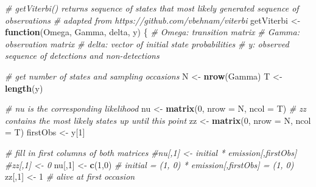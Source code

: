 \documentclass[
  12pt,
]{krantz}
\newenvironment{Shaded}{\begin{snugshade}}{\end{snugshade}}
\newcommand{\AttributeTok}[1]{\textcolor[rgb]{0.13,0.29,0.53}{#1}}
\newcommand{\CommentTok}[1]{\textcolor[rgb]{0.56,0.35,0.01}{\textit{#1}}}
\newcommand{\ControlFlowTok}[1]{\textcolor[rgb]{0.13,0.29,0.53}{\textbf{#1}}}
\newcommand{\DecValTok}[1]{\textcolor[rgb]{0.00,0.00,0.81}{#1}}
\newcommand{\FunctionTok}[1]{\textcolor[rgb]{0.13,0.29,0.53}{\textbf{#1}}}
\newcommand{\NormalTok}[1]{#1}
\newcommand{\OtherTok}[1]{\textcolor[rgb]{0.56,0.35,0.01}{#1}}
\begin{document}
\begin{Shaded}
\begin{Highlighting}[]
\CommentTok{\# getViterbi() returns sequence of states that most likely generated sequence of observations}
\CommentTok{\# adapted from https://github.com/vbehnam/viterbi}
\NormalTok{getViterbi }\OtherTok{\textless{}{-}} \ControlFlowTok{function}\NormalTok{(Omega, Gamma, delta, y) \{}
\CommentTok{\# Omega: transition matrix}
\CommentTok{\# Gamma: observation matrix}
\CommentTok{\# delta: vector of initial state probabilities}
\CommentTok{\# y: observed sequence of detections and non{-}detections}
  
\CommentTok{\# get number of states and sampling occasions}
\NormalTok{N }\OtherTok{\textless{}{-}} \FunctionTok{nrow}\NormalTok{(Gamma)}
\NormalTok{T }\OtherTok{\textless{}{-}} \FunctionTok{length}\NormalTok{(y)}
  
\CommentTok{\# nu is the corresponding likelihood}
\NormalTok{nu }\OtherTok{\textless{}{-}} \FunctionTok{matrix}\NormalTok{(}\DecValTok{0}\NormalTok{, }\AttributeTok{nrow =}\NormalTok{ N, }\AttributeTok{ncol =}\NormalTok{ T)}
\CommentTok{\# zz contains the most likely states up until this point}
\NormalTok{zz }\OtherTok{\textless{}{-}} \FunctionTok{matrix}\NormalTok{(}\DecValTok{0}\NormalTok{, }\AttributeTok{nrow =}\NormalTok{ N, }\AttributeTok{ncol =}\NormalTok{ T)}
\NormalTok{firstObs }\OtherTok{\textless{}{-}}\NormalTok{ y[}\DecValTok{1}\NormalTok{]}
  
\CommentTok{\# fill in first columns of both matrices}
\CommentTok{\#nu[,1] \textless{}{-} initial * emission[,firstObs]}
\CommentTok{\#zz[,1] \textless{}{-} 0}
\NormalTok{nu[,}\DecValTok{1}\NormalTok{] }\OtherTok{\textless{}{-}} \FunctionTok{c}\NormalTok{(}\DecValTok{1}\NormalTok{,}\DecValTok{0}\NormalTok{) }\CommentTok{\# initial = (1, 0) * emission[,firstObs] = (1, 0)}
\NormalTok{zz[,}\DecValTok{1}\NormalTok{] }\OtherTok{\textless{}{-}} \DecValTok{1} \CommentTok{\# alive at first occasion}


\end{Highlighting}
\end{Shaded}
\end{document}
